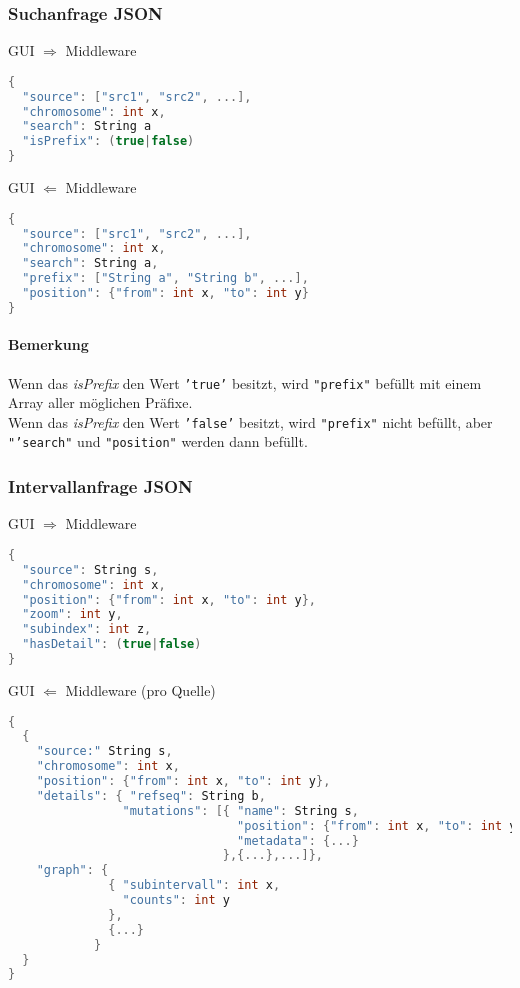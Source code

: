 \documentclass{scrartcl}
\begin{document}
\subsubsection{Suchanfrage JSON}
GUI $\Rightarrow$ Middleware
\begin{lstlisting}[language=c,
commentstyle=\fontsize{12}{14.4}\ttfamily,
basicstyle=\ttfamily\fontsize{10}{12}\selectfont, showstringspaces=false]
{
  "source": ["src1", "src2", ...],
  "chromosome": int x,
  "search": String a
  "isPrefix": (true|false)
}
\end{lstlisting}
GUI $\Leftarrow$ Middleware
\begin{lstlisting}[language=c,
commentstyle=\fontsize{12}{14.4}\ttfamily,
basicstyle=\ttfamily\fontsize{10}{12}\selectfont, showstringspaces=false]
{
  "source": ["src1", "src2", ...],
  "chromosome": int x,
  "search": String a,
  "prefix": ["String a", "String b", ...],
  "position": {"from": int x, "to": int y}
}
\end{lstlisting}
\paragraph{Bemerkung} Wenn das \textit{isPrefix} den Wert \texttt{'true'} besitzt, wird \texttt{"prefix"} befüllt mit einem Array aller möglichen Präfixe.\\
Wenn das \textit{isPrefix} den Wert \texttt{'false'} besitzt, wird \texttt{"prefix"} nicht befüllt, aber \texttt{"'search"} und \texttt{"position"} werden dann befüllt.
\newpage

\subsubsection{Intervallanfrage JSON}
GUI $\Rightarrow$ Middleware
\begin{lstlisting}[language=c,
commentstyle=\fontsize{12}{14.4}\selectfont,
basicstyle=\ttfamily\fontsize{10}{12}\selectfont, showstringspaces=false]
{
  "source": String s,
  "chromosome": int x,
  "position": {"from": int x, "to": int y},
  "zoom": int y,
  "subindex": int z,
  "hasDetail": (true|false)
}
\end{lstlisting}
GUI $\Leftarrow$ Middleware (pro Quelle)
\begin{lstlisting}[language=c,
commentstyle=\fontsize{12}{14.4}\selectfont,
basicstyle=\ttfamily\fontsize{10}{12}\selectfont, showstringspaces=false]
{
  {
    "source:" String s,
    "chromosome": int x,
    "position": {"from": int x, "to": int y},
    "details": { "refseq": String b,
                "mutations": [{ "name": String s,
                                "position": {"from": int x, "to": int y},
                                "metadata": {...}
                              },{...},...]},
    "graph": {
              { "subintervall": int x,
                "counts": int y
              },
              {...}
            }
  }
}
\end{lstlisting}
\end{document}
